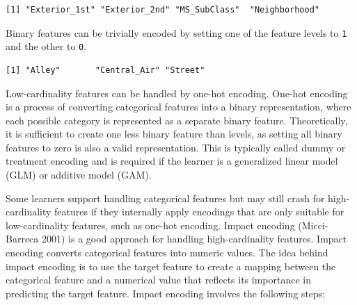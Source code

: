 \begin{Shaded}
\begin{Highlighting}[]
\NormalTok{(}\NormalTok{(}\SpecialCharTok{$}\NormalTok{()) }\SpecialCharTok{\textgreater{}} \NormalTok{))}
\end{Highlighting}
\end{Shaded}

\begin{verbatim}
[1] "Exterior_1st" "Exterior_2nd" "MS_SubClass"  "Neighborhood"
\end{verbatim}

Binary features can be trivially encoded by setting one of the feature
levels to \texttt{1} and the other to \texttt{0}.

\begin{Shaded}
\begin{Highlighting}[]
\NormalTok{(}\NormalTok{(}\SpecialCharTok{$}\NormalTok{()) }\SpecialCharTok{==} \NormalTok{))}
\end{Highlighting}
\end{Shaded}

\begin{verbatim}
[1] "Alley"       "Central_Air" "Street"     
\end{verbatim}

Low-cardinality features can be handled by one-hot
encoding. One-hot encoding is a process of
converting categorical features into a binary representation, where each
possible category is represented as a separate binary feature.
Theoretically, it is sufficient to create one less binary feature than
levels, as setting all binary features to zero is also a valid
representation. This is typically called
dummy or treatment
encoding and is required if the learner is a
generalized linear model (GLM) or additive model
(GAM).

Some learners support handling categorical features but may still crash
for high-cardinality features if they internally apply encodings that
are only suitable for low-cardinality features, such as one-hot
encoding. Impact encoding (Micci-Barreca 2001) is a good approach for
handling high-cardinality features. Impact
encoding converts categorical features into numeric
values. The idea behind impact encoding is to use the target feature to
create a mapping between the categorical feature and a numerical value
that reflects its importance in predicting the target feature. Impact
encoding involves the following steps:

